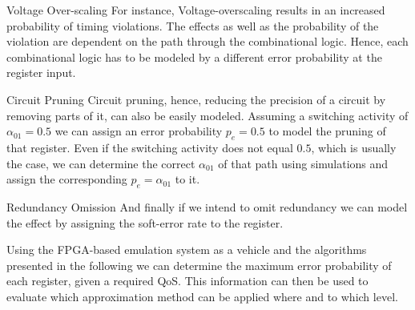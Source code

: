 \documentclass[conference]{IEEEtran}
\begin{document}
\begin{LaTeXdescription}
\item[Voltage Over-scaling] For instance, Voltage-overscaling results in an increased probability of timing violations. The effects as well as the probability of the violation are dependent on the path through the combinational logic. Hence, each combinational logic has to be modeled by a different error probability at the register input.
\item[Circuit Pruning] Circuit pruning, hence, reducing the precision of a circuit by removing parts of it, can also be easily modeled. Assuming a switching activity of $\alpha_{01}=0.5$ we can assign an error probability $p_e=0.5$ to model the pruning of that register. Even if the switching activity does not equal $0.5$, which is usually the case, we can determine the correct $\alpha_{01}$ of that path using simulations and assign the corresponding $p_e=\alpha_{01}$ to it.
\item [Redundancy Omission] And finally if we intend to omit redundancy we can model the effect by assigning the soft-error rate to the register.
\end{LaTeXdescription}
Using the FPGA-based emulation system as a vehicle and the algorithms presented in the following we can determine the maximum error probability of each register, given a required QoS. This information can then be used to evaluate which approximation method can be applied where and to which level.  
\end{document}
